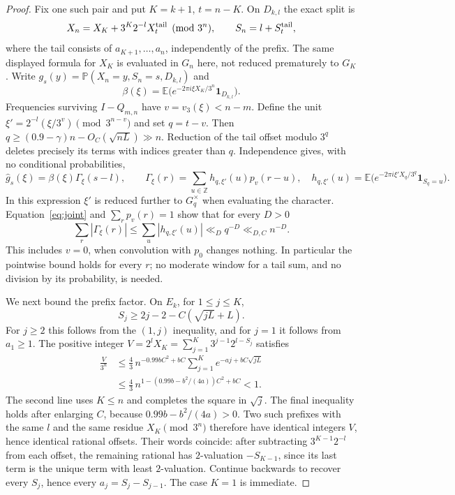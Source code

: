 \documentclass[11pt]{article}
\theoremstyle{remark}\newtheorem{remark}[proposition]{Remark}
\newcommand{\PP}{\mathbb P}
\newcommand{\EE}{\mathbb E}
\newcommand{\ZZ}{\mathbb Z}
\newcommand{\one}{\mathbf 1}
\begin{document}
\begin{proof}
Fix one such pair and put $K=k+1$, $t=n-K$. On $D_{k,l}$ the exact split is
\[
 X_n=X_K+3^K2^{-l}X_t^{\rm tail}\pmod{3^n},\qquad
 S_n=l+S_t^{\rm tail},
\]
where the tail consists of $a_{K+1},\ldots,a_n$, independently of the
prefix. The same displayed formula for $X_K$ is evaluated in $G_n$ here,
not reduced prematurely to $G_K$.
Write $g_s(y)=\PP(X_n=y,S_n=s,D_{k,l})$ and
\[
 \beta(\xi)=\EE\big(e^{-2\pi i\xi X_K/3^n}\one_{D_{k,l}}\big).
\]
Frequencies surviving $I-Q_{m,n}$ have
$v=v_3(\xi)<n-m$. Define the unit
$\xi'=2^{-l}(\xi/3^v)\pmod{3^{n-v}}$ and set $q=t-v$.
Then $q\ge(0.9-\gamma)n-O_C(\sqrt{nL})\gg n$.
Reduction of the tail offset modulo $3^q$ deletes precisely its terms
with indices greater than $q$. Independence gives, with no conditional
probabilities,
\begin{equation}\label{eq:joint-split}
 \widehat g_s(\xi)=\beta(\xi)\Gamma_\xi(s-l),\qquad
 \Gamma_\xi(r)=\sum_{u\in\ZZ}h_{q,\xi'}(u)p_v(r-u),
 \quad
 h_{q,\xi'}(u)=\EE\big(e^{-2\pi i\xi'X_q/3^q}\one_{S_q=u}\big).
\end{equation}
In this expression $\xi'$ is reduced further to $G_q^\times$ when
evaluating the character. Equation~\eqref{eq:joint} and
$\sum_r p_v(r)=1$ show that for every $D>0$
\begin{equation}\label{eq:joint-tail}
 \sum_r|\Gamma_\xi(r)|
 \le\sum_u|h_{q,\xi'}(u)|\ll_Dq^{-D}\ll_{D,C}n^{-D}.
\end{equation}
This includes $v=0$, when convolution with $p_0$ changes nothing.
In particular the pointwise bound holds for every $r$; no moderate
window for a tail sum, and no division by its probability, is needed.

We next bound the prefix factor. On $E_k$, for $1\le j\le K$,
\[
 S_j\ge2j-2-C(\sqrt{jL}+L).
\]
For $j\ge2$ this follows from the $(1,j)$ inequality, and for $j=1$
it follows from $a_1\ge1$. The positive integer
$V=2^lX_K=\sum_{j=1}^K3^{j-1}2^{l-S_j}$ satisfies
\begin{align*}
 \frac{V}{3^n}
 &\le\frac43\,n^{-0.99bC^2+bC}
       \sum_{j=1}^K e^{-aj+bC\sqrt{jL}}\\
 &\le\frac43\,n^{1-(0.99b-b^2/(4a))C^2+bC}<1.
\end{align*}
The second line uses $K\le n$ and completes the square in $\sqrt j$.
The final inequality holds after enlarging $C$, because
$0.99b-b^2/(4a)>0$. Two such prefixes with the same $l$ and the same
residue $X_K\pmod{3^n}$ therefore have identical integers $V$, hence
identical rational offsets. Their words coincide: after subtracting
$3^{K-1}2^{-l}$ from each offset, the remaining rational has
$2$-valuation $-S_{K-1}$, since its last term is the unique term with
least $2$-valuation. Continue backwards to recover every $S_j$, hence
every $a_j=S_j-S_{j-1}$. The case $K=1$ is immediate.


\end{proof}
\end{document}

